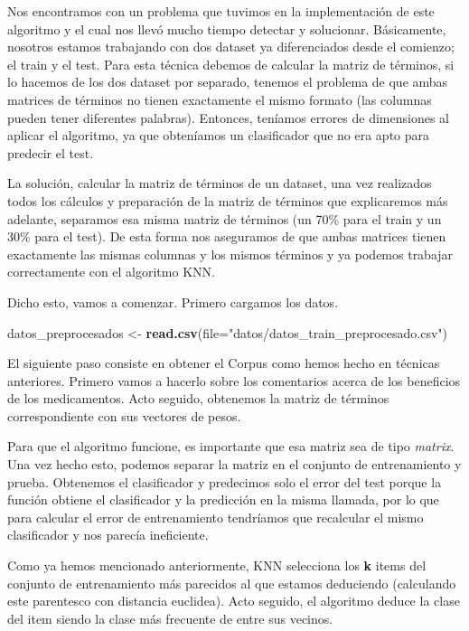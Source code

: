\documentclass[spanish,]{article}
\newenvironment{Shaded}{\begin{snugshade}}{\end{snugshade}}
\newcommand{\KeywordTok}[1]{\textcolor[rgb]{0.13,0.29,0.53}{\textbf{#1}}}
\newcommand{\DataTypeTok}[1]{\textcolor[rgb]{0.13,0.29,0.53}{#1}}
\newcommand{\StringTok}[1]{\textcolor[rgb]{0.31,0.60,0.02}{#1}}
\newcommand{\NormalTok}[1]{#1}
\begin{document}
Nos encontramos con un problema que tuvimos en la implementación de este
algoritmo y el cual nos llevó mucho tiempo detectar y solucionar.
Básicamente, nosotros estamos trabajando con dos dataset ya
diferenciados desde el comienzo; el train y el test. Para esta técnica
debemos de calcular la matriz de términos, si lo hacemos de los dos
dataset por separado, tenemos el problema de que ambas matrices de
términos no tienen exactamente el mismo formato (las columnas pueden
tener diferentes palabras). Entonces, teníamos errores de dimensiones al
aplicar el algoritmo, ya que obteníamos un clasificador que no era apto
para predecir el test.

La solución, calcular la matriz de términos de un dataset, una vez
realizados todos los cálculos y preparación de la matriz de términos que
explicaremos más adelante, separamos esa misma matriz de términos (un
70\% para el train y un 30\% para el test). De esta forma nos aseguramos
de que ambas matrices tienen exactamente las mismas columnas y los
mismos términos y ya podemos trabajar correctamente con el algoritmo
KNN.

Dicho esto, vamos a comenzar. Primero cargamos los datos.

\begin{Shaded}
\begin{Highlighting}[]
\NormalTok{datos_preprocesados <-}\StringTok{ }\KeywordTok{read.csv}\NormalTok{(}\DataTypeTok{file=}\StringTok{"datos/datos_train_preprocesado.csv"}\NormalTok{)}
\end{Highlighting}
\end{Shaded}

El siguiente paso consiste en obtener el Corpus como hemos hecho en
técnicas anteriores. Primero vamos a hacerlo sobre los comentarios
acerca de los beneficios de los medicamentos. Acto seguido, obtenemos la
matriz de términos correspondiente con sus vectores de pesos.

Para que el algoritmo funcione, es importante que esa matriz sea de tipo
\emph{matrix}. Una vez hecho esto, podemos separar la matriz en el
conjunto de entrenamiento y prueba. Obtenemos el clasificador y
predecimos solo el error del test porque la función obtiene el
clasificador y la predicción en la misma llamada, por lo que para
calcular el error de entrenamiento tendríamos que recalcular el mismo
clasificador y nos parecía ineficiente.

Como ya hemos mencionado anteriormente, KNN selecciona los \textbf{k}
items del conjunto de entrenamiento más parecidos al que estamos
deduciendo (calculando este parentesco con distancia euclidea). Acto
seguido, el algoritmo deduce la clase del item siendo la clase más
frecuente de entre sus vecinos.
\end{document}
